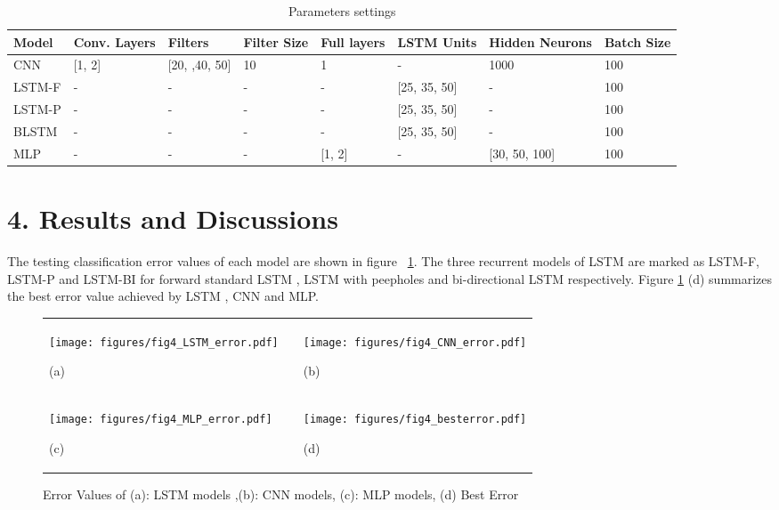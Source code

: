 \documentclass[12pt,a4paper]{article}
\begin{document}
\begin{table}
\small
\caption{ Parameters settings}\label{exp. results}
\begin{center}
\begin{tabular}{ |p{1.3cm}| p{1.5cm} p{2cm} p{1cm} p{1cm} p{1.5cm} p{1.8cm} p{1cm}|}
\hline
Model & Conv. Layers &Filters & Filter Size & Full layers & LSTM Units & Hidden Neurons & Batch Size \\
\hline
CNN & [1, 2]&[20, ,40, 50] &10 &1 & - & 1000&100\\
\hline
LSTM-F &- & - & -  & - & [25, 35, 50] &   - &100\\
\hline
LSTM-P &- & - & -  & - & [25, 35, 50] &   - &100\\
\hline
BLSTM & -& - & -  & - & [25, 35, 50] &  - &100\\
\hline
MLP& -& - & -  & [1, 2] & - & [30, 50, 100] &100\\
\hline
\end{tabular}
\end{center}
\end{table}


\section*{4. Results and Discussions}
The testing classification error values of each model are shown in figure ~\ref{error}. The three recurrent models of LSTM are marked as LSTM-F, LSTM-P and LSTM-BI for forward standard LSTM , LSTM with peepholes and bi-directional LSTM respectively. Figure \ref{error} (d) summarizes the best error value achieved by LSTM , CNN and MLP.

\begin{figure}[h!]
 \centering
\begin{tabular}{ p{6cm} p{1cm} p{6cm} }
\texttt{[image: figures/fig4\_LSTM\_error.pdf]}{\begin{center}(a)\end{center} }& & \texttt{[image: figures/fig4\_CNN\_error.pdf]}{\begin{center}(b) \end{center} }\\
\texttt{[image: figures/fig4\_MLP\_error.pdf]}{\begin{center}(c) \end{center} }& &
\texttt{[image: figures/fig4\_besterror.pdf]}{\begin{center}(d) \end{center} }\\
\end{tabular}
\caption{Error Values of (a): LSTM models ,(b): CNN models, (c): MLP models, (d) Best Error}
\label{error}
\end{figure}
\end{document}

